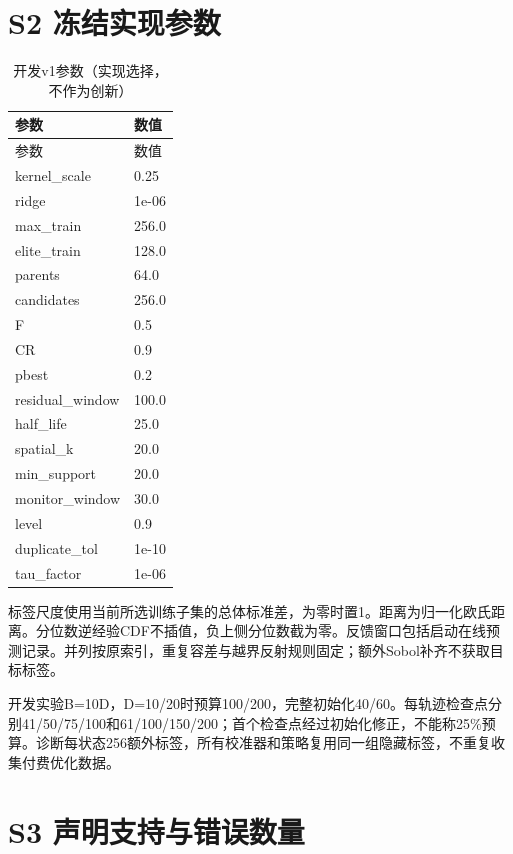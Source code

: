 \documentclass[11pt,a4paper]{article}
\begin{document}
\hypertarget{s2-ux51bbux7ed3ux5b9eux73b0ux53c2ux6570}{%
\section{S2
冻结实现参数}\label{s2-ux51bbux7ed3ux5b9eux73b0ux53c2ux6570}}

\par\noindent\begin{minipage}{\linewidth}

\begin{longtable}[]{@{}ll@{}}
\caption{开发v1参数（实现选择，不作为创新）}\tabularnewline
\toprule
参数 & 数值 \\
\midrule
\endfirsthead
\toprule
参数 & 数值 \\
\midrule
\endhead
kernel\_scale & 0.25 \\
ridge & 1e-06 \\
max\_train & 256.0 \\
elite\_train & 128.0 \\
parents & 64.0 \\
candidates & 256.0 \\
F & 0.5 \\
CR & 0.9 \\
pbest & 0.2 \\
residual\_window & 100.0 \\
half\_life & 25.0 \\
spatial\_k & 20.0 \\
min\_support & 20.0 \\
monitor\_window & 30.0 \\
level & 0.9 \\
duplicate\_tol & 1e-10 \\
tau\_factor & 1e-06 \\
\bottomrule
\end{longtable}

\end{minipage}\par

标签尺度使用当前所选训练子集的总体标准差，为零时置1。距离为归一化欧氏距离。分位数逆经验CDF不插值，负上侧分位数截为零。反馈窗口包括启动在线预测记录。并列按原索引，重复容差与越界反射规则固定；额外Sobol补齐不获取目标标签。

开发实验B=10D，D=10/20时预算100/200，完整初始化40/60。每轨迹检查点分别41/50/75/100和61/100/150/200；首个检查点经过初始化修正，不能称25\%预算。诊断每状态256额外标签，所有校准器和策略复用同一组隐藏标签，不重复收集付费优化数据。

\hypertarget{s3-ux58f0ux660eux652fux6301ux4e0eux9519ux8befux6570ux91cf}{%
\section{S3
声明支持与错误数量}\label{s3-ux58f0ux660eux652fux6301ux4e0eux9519ux8befux6570ux91cf}}
\end{document}
